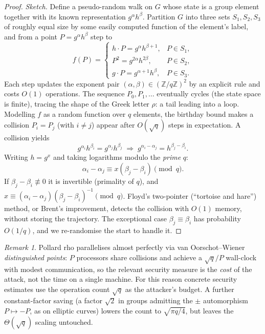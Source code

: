 \documentclass[11pt,a4paper]{article}
\theoremstyle{definition}
\theoremstyle{remark}
\newtheorem{remark}[theorem]{Remark}
\newcommand{\Z}{\ensuremath{\mathbb{Z}}}
\begin{document}
\begin{proof}
\emph{Sketch.} Define a pseudo-random walk on \(G\) whose state is a group element together with its known representation \(g^{\alpha} h^{\beta}\). Partition \(G\) into three sets \(S_1, S_2, S_3\) of roughly equal size by some easily computed function of the element's label, and from a point \(P = g^{\alpha} h^{\beta}\) step to
\[
f(P) = \begin{cases} h \cdot P = g^{\alpha} h^{\beta + 1}, & P \in S_1,\\[2pt] P^2 = g^{2\alpha} h^{2\beta}, & P \in S_2,\\[2pt] g \cdot P = g^{\alpha+1} h^{\beta}, & P \in S_3. \end{cases}
\]
Each step updates the exponent pair \((\alpha, \beta) \in (\Z/q\Z)^2\) by an explicit rule and costs \(O(1)\) operations. The sequence \(P_0, P_1, \dots\) eventually cycles (the state space is finite), tracing the shape of the Greek letter \(\rho\): a tail leading into a loop. Modelling \(f\) as a random function over \(q\) elements, the birthday bound makes a collision \(P_i = P_j\) (with \(i \ne j\)) appear after \(O(\sqrt q)\) steps in expectation. A collision yields
\[
g^{\alpha_i} h^{\beta_i} = g^{\alpha_j} h^{\beta_j} \;\Longrightarrow\; g^{\alpha_i - \alpha_j} = h^{\beta_j - \beta_i}.
\]
Writing \(h = g^x\) and taking logarithms modulo the \emph{prime} \(q\):
\[
\alpha_i - \alpha_j \equiv x(\beta_j - \beta_i) \pmod q.
\]
If \(\beta_j - \beta_i \not\equiv 0\) it is invertible (primality of \(q\)), and \(x \equiv (\alpha_i - \alpha_j)(\beta_j - \beta_i)^{-1} \pmod q\). Floyd's two-pointer (``tortoise and hare'') method, or Brent's improvement, detects the collision with \(O(1)\) memory, without storing the trajectory. The exceptional case \(\beta_j \equiv \beta_i\) has probability \(O(1/q)\), and we re-randomise the start to handle it.
\end{proof}

\begin{remark}
\label{assumptions:rem:rho-parallel}
Pollard rho parallelises almost perfectly via van Oorschot--Wiener \emph{distinguished points}: \(P\) processors share collisions and achieve a \(\sqrt q / P\) wall-clock with modest communication, so the relevant security measure is the \emph{cost} of the attack, not the time on a single machine. For this reason concrete security estimates use the operation count \(\sqrt q\) as the attacker's budget. A further constant-factor saving (a factor \(\sqrt 2\) in groups admitting the \(\pm\) automorphism \(P \mapsto -P\), as on elliptic curves) lowers the count to \(\sqrt{\pi q / 4}\), but leaves the \(\Theta(\sqrt q)\) scaling untouched.
\end{remark}
\end{document}
